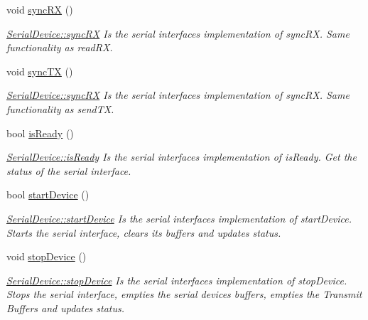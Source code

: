 \begin{DoxyCompactItemize}
void \hyperlink{class_serial_device_a79c9685f76771703557b2044e941f27a}{sync\+RX} ()
\begin{DoxyCompactList}\small\item\em \hyperlink{class_serial_device_a79c9685f76771703557b2044e941f27a}{Serial\+Device\+::sync\+RX} Is the serial interface\textquotesingle{}s implementation of sync\+RX. Same functionality as read\+RX. \end{DoxyCompactList}\item 
void \hyperlink{class_serial_device_a8e53f81ff51ef332a03c3276804a32c8}{sync\+TX} ()
\begin{DoxyCompactList}\small\item\em \hyperlink{class_serial_device_a79c9685f76771703557b2044e941f27a}{Serial\+Device\+::sync\+RX} Is the serial interface\textquotesingle{}s implementation of sync\+RX. Same functionality as send\+TX. \end{DoxyCompactList}\item 
bool \hyperlink{class_serial_device_aa2435fb76a612b2ebf1a61287deee85d}{is\+Ready} ()
\begin{DoxyCompactList}\small\item\em \hyperlink{class_serial_device_aa2435fb76a612b2ebf1a61287deee85d}{Serial\+Device\+::is\+Ready} Is the serial interface\textquotesingle{}s implementation of is\+Ready. Get the status of the serial interface. \end{DoxyCompactList}\item 
bool \hyperlink{class_serial_device_a6940a33b7c8f4b83438d16cfa7d8d3ff}{start\+Device} ()
\begin{DoxyCompactList}\small\item\em \hyperlink{class_serial_device_a6940a33b7c8f4b83438d16cfa7d8d3ff}{Serial\+Device\+::start\+Device} Is the serial interface\textquotesingle{}s implementation of start\+Device. Starts the serial interface, clears its buffers and updates status. \end{DoxyCompactList}\item 
void \hyperlink{class_serial_device_a55f94898f33ab4674c138fa2cb2e75a1}{stop\+Device} ()
\begin{DoxyCompactList}\small\item\em \hyperlink{class_serial_device_a55f94898f33ab4674c138fa2cb2e75a1}{Serial\+Device\+::stop\+Device} Is the serial interface\textquotesingle{}s implementation of stop\+Device. Stops the serial interface, empties the serial devices buffers, empties the Transmit Buffers and updates status. \end{DoxyCompactList}\item 

\end{DoxyCompactItemize}
